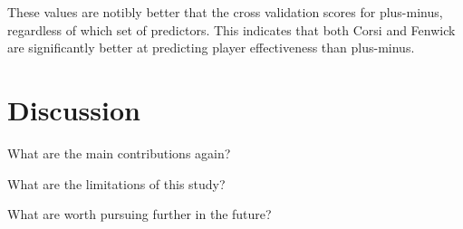 \documentclass[12pt]{article}
\begin{document}
These values are notibly better that the cross validation scores for plus-minus, regardless of which set of predictors. This indicates
that both Corsi and Fenwick are significantly better at predicting player effectiveness than plus-minus.


\section{Discussion}
\label{sec:disc}

What are the main contributions again?

What are the limitations of this study?

What are worth pursuing further in the future?





\end{document}
